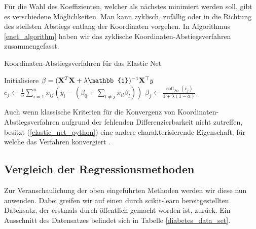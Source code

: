 Für die Wahl des Koeffizienten, welcher als nächstes minimiert werden soll, gibt es verschiedene Möglichkeiten. Man kann zyklisch, zufällig oder in die Richtung des steilsten Abstiegs entlang der Koordinaten vorgehen. In Algorithmus \ref{enet_algorithm} haben wir das zyklische Koordinaten-Abstiegsverfahren zusammengefasst.

\begin{algorithm}[tbh]
    \caption{Koordinaten-Abstiegsverfahren für das Elastic Net}
    \label{enet_algorithm}
    \begin{algorithmic}[1]
        	\State Initialisiere $\beta = (\mat X^T\mat X + \lambda\mat{\mathbb{1}})^{-1}\mat X^{\top}y$
                	\State $c_j \gets \frac{1}{n}\sum_{i=1}^n x_{ij}(y_i - (\beta_0 + \sum_{l \neq j} x_{il}\beta_l))$
                	\State $\beta_j \gets \frac{\operatorname{soft}_{\lambda\alpha}(c_j)}{1 + \lambda (1-\alpha)}$
        		\EndFor
        	\EndWhile
        \EndProcedure
    \end{algorithmic}
\end{algorithm} 

Auch wenn klassische Kriterien für die Konvergenz von Koordinaten-Abstiegsverfahren aufgrund der fehlenden Differenzierbarkeit nicht zutreffen, besitzt (\ref{elastic_net_python}) eine andere charakterisierende Eigenschaft, für welche das Verfahren konvergiert \cite{tseng}.




\subsection{Vergleich der Regressionsmethoden}
\label{comparison_linear_models}

Zur Veranschaulichung der oben eingeführten Methoden werden wir diese nun anwenden. Dabei greifen wir auf einen durch scikit-learn \cite{scikit_learn} bereitgestellten Datensatz, der erstmals durch \cite{efron_lars} öffentlich gemacht worden ist, zurück. Ein Ausschnitt des Datensatzes befindet sich in Tabelle \ref{diabetes_data_set}.

